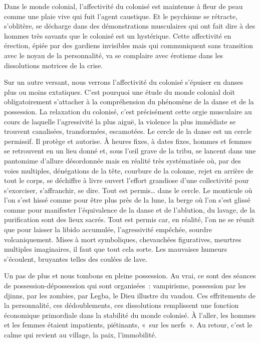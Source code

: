 \documentclass[french,twoside]{book} %
\begin{document}
Dans le monde colonial, l’affectivité du colonisé est maintenue à fleur de peau comme une plaie vive qui fuit l’agent caustique. Et le psychisme se rétracte, s’oblitère, se décharge dans des démonstrations musculaires qui ont fait dire à des hommes très savants que le colonisé est un hystérique. Cette affectivité en érection, épiée par des gardiens invisibles mais qui communiquent sans transition avec le noyau de la personnalité, va se complaire avec érotisme dans les dissolutions motrices de la crise.\par
Sur un autre versant, nous verrons l’affectivité du colonisé s’épuiser en danses plus ou moins extatiques. C’est pourquoi une étude du monde colonial doit obligatoirement s’attacher à la compréhension du phénomène de la danse et de la possession. La relaxation du colonisé, c’est précisément cette orgie musculaire au cours de laquelle l’agressivité la plus aiguë, la violence   la plus immédiate se trouvent canalisées, transformées, escamotées. Le cercle de la danse est un cercle permissif. Il protège et autorise. À heures fixes, à dates fixes, hommes et femmes se retrouvent en un lieu donné et, sous l’œil grave de la tribu, se lancent dans une pantomime d’allure désordonnée mais en réalité très systématisée où, par des voies multiples, dénégations de la tête, courbure de la colonne, rejet en arrière de tout le corps, se déchiffre à livre ouvert l’effort grandiose d’une collectivité pour s’exorciser, s’affranchir, se dire. Tout est permis… dans le cercle. Le monticule où l’on s’est hissé comme pour être plus près de la lune, la berge où l’on s’est glissé comme pour manifester l’équivalence de la danse et de l’ablution, du lavage, de la purification sont des lieux sacrés. Tout est permis car, en réalité, l’on ne se réunit que pour laisser la libido accumulée, l’agressivité empêchée, sourdre volcaniquement. Mises à mort symboliques, chevauchées figuratives, meurtres multiples imaginaires, il faut que tout cela sorte. Les mauvaises humeurs s’écoulent, bruyantes telles des coulées de lave.\par
Un pas de plus et nous tombons en pleine possession. Au vrai, ce sont des séances de possession-dépossession qui sont organisées : vampirisme, possession par les djinns, par les zombies, par Legba, le Dieu illustre du vaudou. Ces effritements de la personnalité, ces dédoublements, ces dissolutions remplissent une fonction économique primordiale dans la stabilité du monde colonisé. À l’aller, les hommes et les femmes étaient impatients, piétinants, « sur les nerfs ». Au retour, c’est le calme qui revient au village, la paix, l’immobilité.\par
\end{document}
